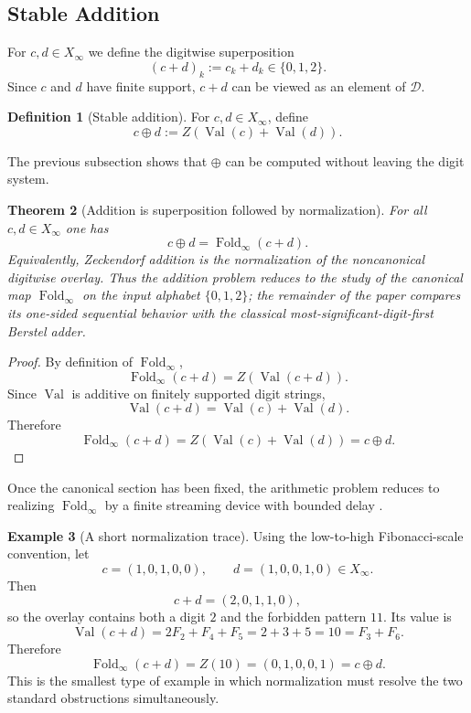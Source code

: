 \documentclass[11pt,letterpaper]{article}
\numberwithin{equation}{section}
\theoremstyle{plain}
\newtheorem{theorem}{Theorem}[section]
\theoremstyle{definition}
\newtheorem{definition}[theorem]{Definition}
\newtheorem{example}[theorem]{Example}
\theoremstyle{remark}
\newcommand{\D}{\mathcal{D}}
\newcommand{\Xinf}{X_\infty}
\DeclareMathOperator{\Val}{Val}
\DeclareMathOperator{\Fold}{Fold}
\begin{document}
\subsection{Stable Addition}

For $c,d\in \Xinf$ we define the digitwise superposition
\[
(c+d)_k:=c_k+d_k \in \{0,1,2\}.
\]
Since $c$ and $d$ have finite support, $c+d$ can be viewed as an element of
$\D$.

\begin{definition}[Stable addition]\label{def:stable-add}
For $c,d\in\Xinf$, define
\[
c\oplus d:=Z(\Val(c)+\Val(d)).
\]
\end{definition}

The previous subsection shows that $\oplus$ can be computed without leaving
the digit system.

\begin{theorem}[Addition is superposition followed by normalization]\label{thm:zeckendorf-add-fst}
For all $c,d\in \Xinf$ one has
\[
c\oplus d=\Fold_\infty(c+d).
\]
Equivalently, Zeckendorf addition is the normalization of the noncanonical
digitwise overlay.  Thus the addition problem reduces to the study of the
canonical map $\Fold_\infty$ on the input alphabet $\{0,1,2\}$; the remainder
of the paper compares its one-sided sequential behavior with the classical
most-significant-digit-first Berstel adder.
\end{theorem}

\begin{proof}
By definition of $\Fold_\infty$,
\[
\Fold_\infty(c+d)=Z(\Val(c+d)).
\]
Since $\Val$ is additive on finitely supported digit strings,
\[
\Val(c+d)=\Val(c)+\Val(d).
\]
Therefore
\[
\Fold_\infty(c+d)=Z(\Val(c)+\Val(d))=c\oplus d.
\]
\end{proof}

Once the canonical section has been fixed, the arithmetic problem reduces to
realizing $\Fold_\infty$ by a finite streaming device with bounded delay
\cite{Frougny1992NumbersAutomata,Frougny1999OnlineAddition,
AhlbachUsatineFrougnyPippenger2013}.

\begin{example}[A short normalization trace]\label{rem:worked-normalization-example}
Using the low-to-high Fibonacci-scale convention, let
\[
c=(1,0,1,0,0),\qquad d=(1,0,0,1,0)\in \Xinf.
\]
Then
\[
c+d=(2,0,1,1,0),
\]
so the overlay contains both a digit $2$ and the forbidden pattern $11$.
Its value is
\[
\Val(c+d)=2F_2+F_4+F_5=2+3+5=10=F_3+F_6.
\]
Therefore
\[
\Fold_\infty(c+d)=Z(10)=(0,1,0,0,1)=c\oplus d.
\]
This is the smallest type of example in which normalization must resolve the
two standard obstructions simultaneously.
\end{example}
\end{document}
